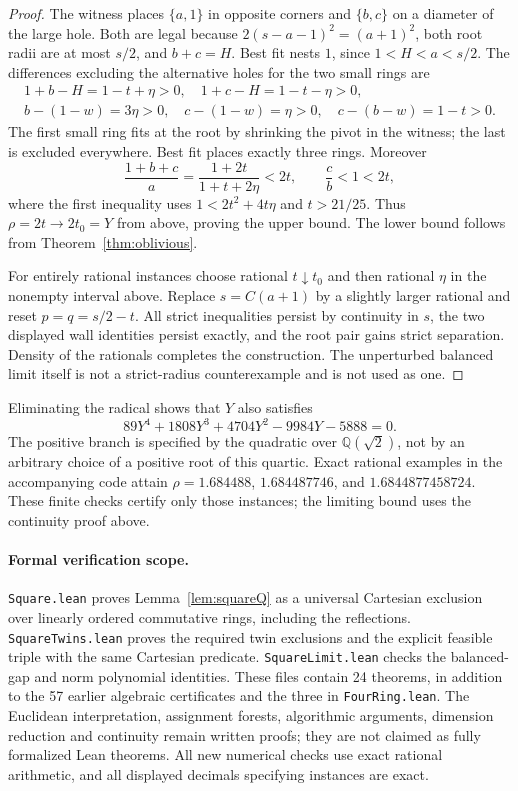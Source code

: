 \documentclass[11pt]{article}
\theoremstyle{definition}
\begin{document}
\begin{proof}
The witness places $\{a,1\}$ in opposite corners and $\{b,c\}$
on a diameter of the large hole. Both are legal because
$2(s-a-1)^2=(a+1)^2$, both root radii are at most $s/2$, and
$b+c=H$. Best fit nests $1$, since $1<H<a<s/2$.
The differences excluding the alternative holes for the two
small rings are
\begin{gather*}
 1+b-H=1-t+\eta>0,\quad 1+c-H=1-t-\eta>0,\\
 b-(1-w)=3\eta>0,\quad c-(1-w)=\eta>0,\quad
 c-(b-w)=1-t>0.
\end{gather*}
The first small ring fits at the root by shrinking the pivot in
the witness; the last is excluded everywhere. Best fit places
exactly three rings. Moreover
\[
 \frac{1+b+c}{a}=\frac{1+2t}{1+t+2\eta}<2t,
 \qquad \frac cb<1<2t,
\]
where the first inequality uses $1<2t^2+4t\eta$ and $t>21/25$.
Thus $\rho=2t\to2t_0=Y$ from above, proving the upper bound.
The lower bound follows from Theorem~\ref{thm:oblivious}.

For entirely rational instances choose rational $t\downarrow t_0$
and then rational $\eta$ in the nonempty interval above. Replace
$s=C(a+1)$ by a slightly larger rational and reset $p=q=s/2-t$.
All strict inequalities persist by continuity in $s$, the two
displayed wall identities persist exactly, and the root pair gains
strict separation. Density of the rationals completes the construction.
The unperturbed balanced limit itself is not a strict-radius
counterexample and is not used as one.
\end{proof}

Eliminating the radical shows that $Y$ also satisfies
\[
 89Y^4+1808Y^3+4704Y^2-9984Y-5888=0.
\]
The positive branch is specified by the quadratic over $\mathbb Q(\sqrt2)$,
not by an arbitrary choice of a positive root of this quartic.
Exact rational examples in the accompanying code attain
$\rho=1.684488$, $1.684487746$, and $1.6844877458724$.
These finite checks certify only those instances; the limiting bound
uses the continuity proof above.

\paragraph{Formal verification scope.}
\texttt{Square.lean} proves Lemma~\ref{lem:squareQ} as a universal
Cartesian exclusion over linearly ordered commutative rings, including
the reflections. \texttt{SquareTwins.lean} proves the required twin
exclusions and the explicit feasible triple with the same Cartesian
predicate. \texttt{SquareLimit.lean} checks the balanced-gap and norm
polynomial identities. These files contain 24 theorems, in addition
to the 57 earlier algebraic certificates and the three in
\texttt{FourRing.lean}. The Euclidean interpretation,
assignment forests, algorithmic arguments, dimension reduction and
continuity remain written proofs; they are not claimed as fully
formalized Lean theorems. All new numerical checks use exact rational
arithmetic, and all displayed decimals specifying instances are exact.
\end{document}
